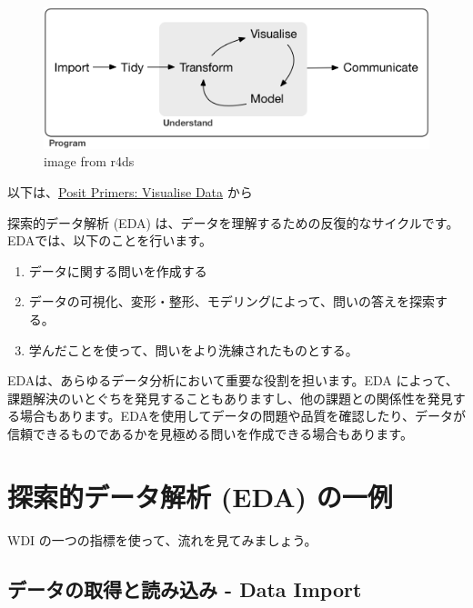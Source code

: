 \documentclass[
  xelatex, ja=standard]{bxjsbook}
\theoremstyle{definition}
\theoremstyle{definition}
\theoremstyle{definition}
\theoremstyle{definition}
\theoremstyle{remark}
\begin{document}
\begin{figure}
\centering
\includegraphics{./data/data-science.png}
\caption{image from r4ds}
\end{figure}

以下は、\href{https://posit.cloud/learn/primers/3.1}{Posit Primers: Visualise Data} から

探索的データ解析 (EDA) は、データを理解するための反復的なサイクルです。EDAでは、以下のことを行います。

\begin{enumerate}
\def\labelenumi{\arabic{enumi}.}
\item
  データに関する問いを作成する
\item
  データの可視化、変形・整形、モデリングによって、問いの答えを探索する。
\item
  学んだことを使って、問いをより洗練されたものとする。
\end{enumerate}

EDAは、あらゆるデータ分析において重要な役割を担います。EDA によって、課題解決のいとぐちを発見することもありますし、他の課題との関係性を発見する場合もあります。EDAを使用してデータの問題や品質を確認したり、データが信頼できるものであるかを見極める問いを作成できる場合もあります。

\hypertarget{ux63a2ux7d22ux7684ux30c7ux30fcux30bfux89e3ux6790-eda-ux306eux4e00ux4f8b}{%
\section{探索的データ解析 (EDA) の一例}\label{ux63a2ux7d22ux7684ux30c7ux30fcux30bfux89e3ux6790-eda-ux306eux4e00ux4f8b}}

WDI の一つの指標を使って、流れを見てみましょう。

\hypertarget{ux30c7ux30fcux30bfux306eux53d6ux5f97ux3068ux8aadux307fux8fbcux307f---data-import}{%
\subsection{データの取得と読み込み - Data Import}\label{ux30c7ux30fcux30bfux306eux53d6ux5f97ux3068ux8aadux307fux8fbcux307f---data-import}}
\end{document}
